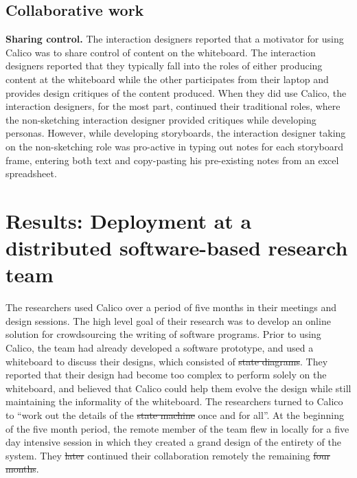 \documentclass[12pt,fleqn]{ucithesis}
\providecommand{\DIFaddtex}[1]{{\protect\color{blue}\uwave{#1}}} %
\providecommand{\DIFdeltex}[1]{{\protect\color{red}\sout{#1}}}                      %
\providecommand{\DIFaddbegin}{} %
\providecommand{\DIFaddend}{} %
\providecommand{\DIFdelbegin}{} %
\providecommand{\DIFdelend}{} %
\providecommand{\DIFadd}[1]{\texorpdfstring{\DIFaddtex{#1}}{#1}} %
\providecommand{\DIFdel}[1]{\texorpdfstring{\DIFdeltex{#1}}{}} %
\begin{document}
\subsection{Collaborative work}

\textbf{Sharing control.} The interaction designers reported that a motivator for using Calico was to share control of content on the whiteboard. The interaction designers reported that they typically fall into the roles of either producing content at the whiteboard while the other participates from their laptop and provides design critiques of the content produced. When they did use Calico, the interaction designers, for the most part, continued their traditional roles, where the non-sketching interaction designer provided critiques while developing personas. However, while developing storyboards, the interaction designer taking on the non-sketching role was pro-active in typing out notes for each storyboard frame, entering both text and copy-pasting his pre-existing notes from an excel spreadsheet.

\section{Results: Deployment at a distributed software-based research team}
\label{chapter:evaluation:deployment3}

The researchers used Calico over a period of five months in their meetings and design sessions. The high level goal of their research was to develop an online solution for crowdsourcing the writing of software programs. Prior to using Calico, the team had already developed a software prototype, and used a whiteboard to discuss their designs, which consisted of \DIFdelbegin \DIFdel{state diagrams}\DIFdelend \DIFaddbegin \DIFadd{process flows}\DIFaddend . They reported that their design had become too complex to perform solely on the whiteboard, and believed that Calico could help them evolve the design while still maintaining the informality of the whiteboard. The researchers turned to Calico to ``work out the details of the \DIFdelbegin \DIFdel{state machine }\DIFdelend \DIFaddbegin \DIFadd{process flow diagram }\DIFaddend once and for all''. At the beginning of the five month period, the remote member of the team flew in locally for a five day intensive session in which they created a grand design of the entirety of the system. They \DIFdelbegin \DIFdel{later }\DIFdelend continued their collaboration remotely the remaining \DIFdelbegin \DIFdel{four months}\DIFdelend \DIFaddbegin \DIFadd{time}\DIFaddend . 
\end{document}
